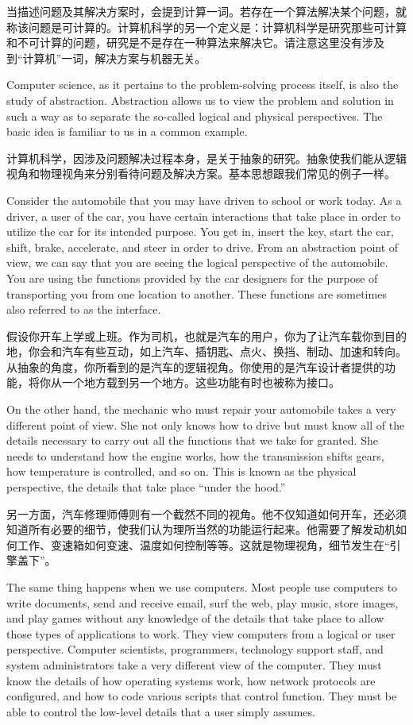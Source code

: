 当描述问题及其解决方案时，会提到计算一词。若存在一个算法解决某个问题，就称该问题是可计算的。计算机科学的另一个定义是：计算机科学是研究那些可计算和不可计算的问题，研究是不是存在一种算法来解决它。请注意这里没有涉及到“计算机”一词，解决方案与机器无关。

Computer science, as it pertains to the problem-solving process itself, is also the study of abstraction. Abstraction allows us to view the problem and solution in such a way as to separate the so-called logical and physical perspectives. The basic idea is familiar to us in a common example.

计算机科学，因涉及问题解决过程本身，是关于抽象的研究。抽象使我们能从逻辑视角和物理视角来分别看待问题及解决方案。基本思想跟我们常见的例子一样。

Consider the automobile that you may have driven to school or work today. As a driver, a user of the car, you have certain interactions that take place in order to utilize the car for its intended purpose. You get in, insert the key, start the car, shift, brake, accelerate, and steer in order to drive. From an abstraction point of view, we can say that you are seeing the logical perspective of the automobile. You are using the functions provided by the car designers for the purpose of transporting you from one location to another. These functions are sometimes also referred to as the interface.

假设你开车上学或上班。作为司机，也就是汽车的用户，你为了让汽车载你到目的地，你会和汽车有些互动，如上汽车、插钥匙、点火、换挡、制动、加速和转向。从抽象的角度，你所看到的是汽车的逻辑视角。你使用的是汽车设计者提供的功能，将你从一个地方载到另一个地方。这些功能有时也被称为接口。

On the other hand, the mechanic who must repair your automobile takes a very different point of view. She not only knows how to drive but must know all of the details necessary to carry out all the functions that we take for granted. She needs to understand how the engine works, how the transmission shifts gears, how temperature is controlled, and so on. This is known as the physical perspective, the details that take place “under the hood.”

另一方面，汽车修理师傅则有一个截然不同的视角。他不仅知道如何开车，还必须知道所有必要的细节，使我们认为理所当然的功能运行起来。他需要了解发动机如何工作、变速箱如何变速、温度如何控制等等。这就是物理视角，细节发生在“引擎盖下”。

The same thing happens when we use computers. Most people use computers to write documents, send and receive email, surf the web, play music, store images, and play games without any knowledge of the details that take place to allow those types of applications to work. They view computers from a logical or user perspective. Computer scientists, programmers, technology support staff, and system administrators take a very different view of the computer. They must know the details of how operating systems work, how network protocols are configured, and how to code various scripts that control function. They must be able to control the low-level details that a user simply assumes.

